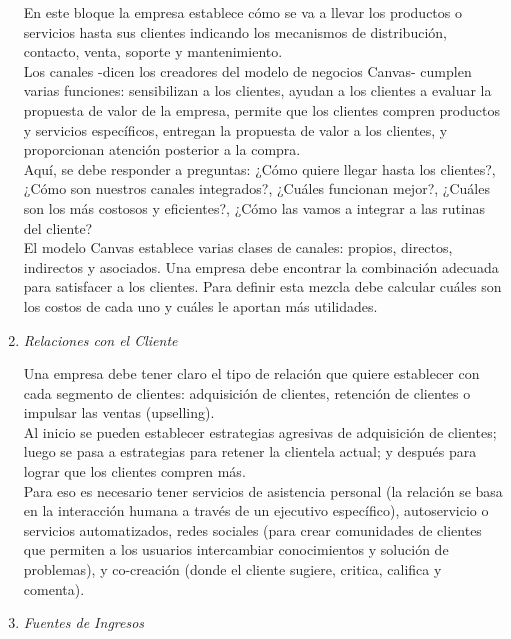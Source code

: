 \documentclass[10pt,a4paper]{article}
\begin{document}
\begin{multicols}{2}
\begin{enumerate}[1.]
			En este bloque la empresa establece cómo se va a llevar los productos o servicios hasta sus clientes indicando los mecanismos de distribución, contacto, venta, soporte y mantenimiento.\\
						
			Los canales -dicen los creadores del modelo de negocios Canvas- cumplen varias funciones: sensibilizan a los clientes, ayudan a los clientes a evaluar la propuesta de valor de la empresa, permite que los clientes compren productos y servicios específicos, entregan la propuesta de valor a los clientes, y proporcionan atención posterior a la compra.\\
			
			Aquí, se debe responder a preguntas: ¿Cómo quiere llegar hasta los clientes?, ¿Cómo son nuestros canales integrados?, ¿Cuáles funcionan mejor?, ¿Cuáles son los más costosos y eficientes?, ¿Cómo las vamos a integrar a las rutinas del cliente?\\
			
			El modelo Canvas establece varias clases de canales: propios, directos, indirectos y asociados. Una empresa debe encontrar la combinación adecuada para satisfacer a los clientes. Para definir esta mezcla debe calcular cuáles son los costos de cada uno y cuáles le aportan más utilidades.
			
			\item \textit{Relaciones con el Cliente}
			
			Una empresa debe tener claro el tipo de relación que quiere establecer con cada segmento de clientes: adquisición de clientes, retención de clientes o impulsar las ventas (upselling).\\
			
			Al inicio se pueden establecer estrategias agresivas de adquisición de clientes; luego se pasa a estrategias para retener la clientela actual; y después para lograr que los clientes compren más.\\
			
			Para eso es necesario tener servicios de asistencia personal (la relación se basa en la interacción humana a través de un ejecutivo específico), autoservicio o servicios automatizados, redes sociales (para crear comunidades de clientes que permiten a los usuarios intercambiar conocimientos y solución de problemas), y co-creación (donde el cliente sugiere, critica, califica y comenta).
			
			\item \textit{Fuentes de Ingresos}
			

\end{enumerate}
\end{multicols}
\end{document}

